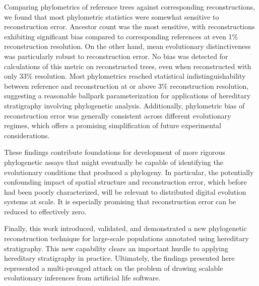 Comparing phylometrics of reference trees against corresponding reconstructions, we found that most phylometric statistics were somewhat sensitive to reconstruction error.
Ancestor count was the most sensitive, with reconstructions exhibiting significant bias compared to corresponding references at even 1\% reconstruction resolution.
On the other hand, mean evolutionary distinctiveness was particularly robust to reconstruction error.
No bias was detected for calculations of this metric on reconstructed trees, even when reconstructed with only 33\% resolution.
Most phylometrics reached statistical indistinguishability between reference and reconstruction at or above 3\% reconstruction resolution, suggesting a reasonable ballpark parameterization for applications of hereditary stratigraphy involving phylogenetic analysis.
Additionally, phylometric bias of reconstruction error was generally consistent across different evolutionary regimes, which offers a promising simplification of future experimental considerations.

These findings contribute foundations for development of more rigorous phylogenetic assays that might eventually be capable of identifying the evolutionary conditions that produced a phylogeny.
In particular, the potentially confounding impact of spatial structure and reconstruction error, which before had been poorly characterized, will be relevant to distributed digital evolution systems at scale.
It is especially promising that reconstruction error can be reduced to effectively zero.

Finally, this work introduced, validated, and demonstrated a new phylogenetic reconstruction technique for large-scale populations annotated using hereditary stratigraphy.
This new capability clears an important hurdle to applying hereditary stratigraphy in practice.
Ultimately, the findings presented here represented a multi-pronged attack on the problem of drawing scalable evolutionary inferences from artificial life software.



